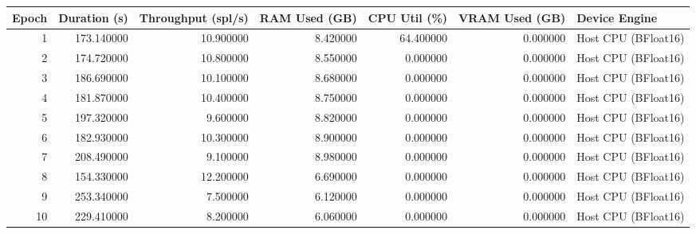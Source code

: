 \begin{tabular}{rrrrrrl}
\toprule
Epoch & Duration (s) & Throughput (spl/s) & RAM Used (GB) & CPU Util (\%) & VRAM Used (GB) & Device Engine \\
\midrule
1 & 173.140000 & 10.900000 & 8.420000 & 64.400000 & 0.000000 & Host CPU (BFloat16) \\
2 & 174.720000 & 10.800000 & 8.550000 & 0.000000 & 0.000000 & Host CPU (BFloat16) \\
3 & 186.690000 & 10.100000 & 8.680000 & 0.000000 & 0.000000 & Host CPU (BFloat16) \\
4 & 181.870000 & 10.400000 & 8.750000 & 0.000000 & 0.000000 & Host CPU (BFloat16) \\
5 & 197.320000 & 9.600000 & 8.820000 & 0.000000 & 0.000000 & Host CPU (BFloat16) \\
6 & 182.930000 & 10.300000 & 8.900000 & 0.000000 & 0.000000 & Host CPU (BFloat16) \\
7 & 208.490000 & 9.100000 & 8.980000 & 0.000000 & 0.000000 & Host CPU (BFloat16) \\
8 & 154.330000 & 12.200000 & 6.690000 & 0.000000 & 0.000000 & Host CPU (BFloat16) \\
9 & 253.340000 & 7.500000 & 6.120000 & 0.000000 & 0.000000 & Host CPU (BFloat16) \\
10 & 229.410000 & 8.200000 & 6.060000 & 0.000000 & 0.000000 & Host CPU (BFloat16) \\
\bottomrule
\end{tabular}
